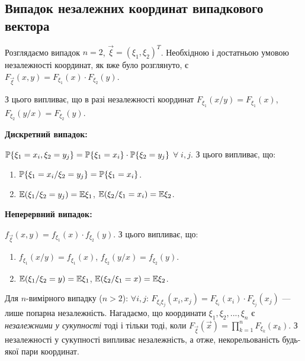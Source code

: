 
\subsection{Випадок незалежних координат випадкового вектора}

Розглядаємо випадок $n=2$, $\vec{\xi} = \left(\xi_1, \xi_2\right)^T$.
Необхідною і достатньою умовою незалежності координат, як вже було розглянуто, є 
$F_{\vec{\xi}}(x, y) = F_{\xi_1}(x)\cdot F_{\xi_2}(y)$.

З цього випливає, що в разі незалежності координат $F_{\xi_1}(x/y) = F_{\xi_1}(x)$, 
$F_{\xi_2}(y/x) = F_{\xi_2}(y)$.

\noindent\textbf{Дискретний випадок: }

$\P\{\xi_1 = x_i, \xi_2 = y_j\} = \P\{\xi_1 = x_i\}\cdot \P\{\xi_2 = y_j\}$ 
$\forall \; i,j$.
З цього випливає, що:

\begin{enumerate}
    \item $\P\{\xi_1 = x_i / \xi_2 = y_j\} = 
    \P\{\xi_1 = x_i\}$.
    \item $\E(\xi_1 / \xi_2 = y_j) = \E\xi_1$,
    $\E(\xi_2 / \xi_1 = x_i) = \E\xi_2$.
\end{enumerate}

\noindent\textbf{Неперервний випадок: }

$f_{\vec{\xi}}(x, y) = f_{\xi_1}(x)\cdot f_{\xi_2}(y)$.
З цього випливає, що:

\begin{enumerate}
    \item $f_{\xi_1}(x/y) = f_{\xi_1}(x)$,    
    $f_{\xi_2}(y/x) = f_{\xi_2}(y)$.
    \item $\E(\xi_1 / \xi_2 = y) = \E\xi_1$, 
    $\E(\xi_2 / \xi_1 = x) = \E\xi_2$.
\end{enumerate}

Для $n$-вимірного випадку ($n > 2$):
$\forall i,j$: $F_{\xi_i\xi_j}(x_i, x_j) = F_{\xi_i}(x_i)\cdot F_{\xi_j}(x_j)$ --- лише
попарна незалежність.
Нагадаємо, що координати $\xi_1, \xi_2, ..., \xi_n$ є \emph{незалежними у сукупності} 
    тоді і тільки тоді, коли $F_{\vec{\xi}}(\vec{x}) = 
    \prod\limits_{k=1}^n F_{\xi_k}(x_k)$.
    З незалежності у сукупності випливає незалежність, а отже, некорельованість будь-якої пари координат.